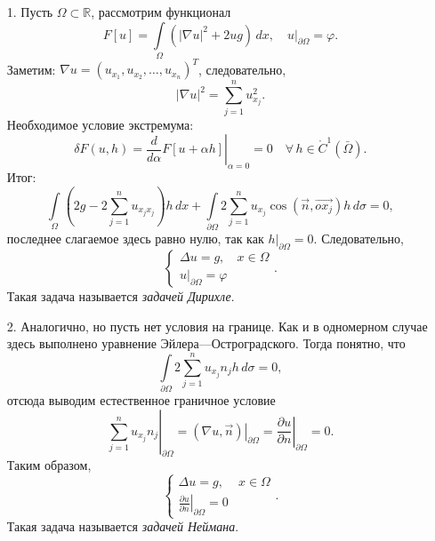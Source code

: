 \documentclass[12pt,a5paper]{book}
\begin{document}
	\begin{itemize}
		\item [1.] Пусть $\Omega \subset \mathbb{R}$, рассмотрим функционал
		\begin{equation*}
			F[u] = \int\limits_\Omega \left(|\nabla u|^2 + 2ug\right)\,dx, \quad \left.u\right|_{\partial\Omega} = \varphi.
		\end{equation*}
		Заметим: $\nabla u = (u_{x_1}, u_{x_2}, \dots, u_{x_n})^T$, следовательно,
		\begin{equation*}
			|\nabla u|^2 = \sum_{j=1}^{n}u_{x_j}^2.
		\end{equation*}
		Необходимое условие экстремума:
		\begin{equation*}
			\delta F(u,h) = \left.\frac{d}{d\alpha}F[u + \alpha h]\right|_{\alpha=0} = 0 \quad \forall\,h \in \mathring{C}^1(\bar{\Omega}).
		\end{equation*}
		Итог:
		\begin{equation*}
			\int\limits_\Omega \left(2g - 2\sum_{j=1}^{n}u_{x_jx_j}\right)h\,dx + \int\limits_{\partial\Omega} 2\sum_{j=1}^{n} u_{x_j}\cos\left(\vec{n},\vec{ox_j}\right)h\,d\sigma = 0,
		\end{equation*}
		последнее слагаемое здесь равно нулю, так как $h|_{\partial\Omega} = 0$. Следовательно,
		\begin{equation*}
			\begin{cases}
				\Delta u = g, & x \in \Omega \\
				\left.u\right|_{\partial\Omega} = \varphi
			\end{cases}.
		\end{equation*}
		Такая задача называется \emph{задачей Дирихле}.
		\item [2.] Аналогично, но пусть нет условия на границе. Как и в одномерном случае здесь выполнено уравнение Эйлера---Остроградского. Тогда понятно, что
		\begin{equation*}
			\int\limits_{\partial\Omega} 2\sum_{j=1}^{n}u_{x_j}n_jh\,d\sigma = 0,
		\end{equation*}
		отсюда выводим естественное граничное условие
		\begin{equation*}
			\left.\sum_{j=1}^{n} u_{x_j}n_j\right|_{\partial\Omega} = \left.\left(\nabla u, \vec{n}\right)\right|_{\partial\Omega} = \left.\frac{\partial u}{\partial n}\right|_{\partial\Omega} = 0.
		\end{equation*}
		Таким образом,
		\begin{equation*}
			\begin{cases}
				\Delta u = g, & x \in \Omega \\
				\left.\frac{\partial u}{\partial n}\right|_{\partial\Omega} = 0
			\end{cases}.
		\end{equation*}
		Такая задача называется \emph{задачей Неймана}.
	\end{itemize}
\end{document}
